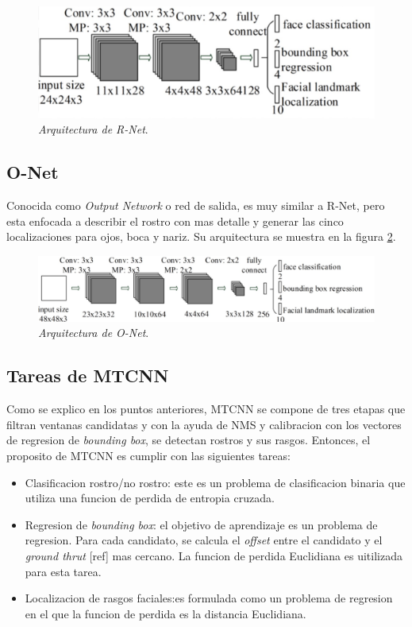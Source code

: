 \begin{figure}[h]
	\centering
	\includegraphics[scale=0.25]{./Figures/mtcnn_rnet.png}
	\caption{\textit{Arquitectura de R-Net}.}
	\label{fig:mtcnn_rnet}
\end{figure}

\subsection{O-Net}
Conocida como \textit{Output Network} o red de salida, es muy similar a R-Net, pero esta enfocada a describir el rostro con mas detalle y generar las cinco localizaciones para ojos, boca y nariz. Su arquitectura se muestra en la figura \ref{fig:mtcnn_onet}.

\begin{figure}[h]
	\centering
	\includegraphics[scale=0.3]{./Figures/mtcnn_onet.png}
	\caption{\textit{Arquitectura de O-Net}.}
	\label{fig:mtcnn_onet}
\end{figure}

\subsection{Tareas de MTCNN}
Como se explico en los puntos anteriores, MTCNN se compone de tres etapas que filtran ventanas candidatas y con la ayuda de NMS y calibracion con los vectores de regresion de \textit{bounding box}, se detectan rostros y sus rasgos. Entonces, el proposito de MTCNN es cumplir con las siguientes tareas:
\begin{itemize}
	\item Clasificacion rostro/no rostro: este es un problema de clasificacion binaria que utiliza una funcion de perdida de entropia cruzada. 
	\item Regresion de \textit{bounding box}: el objetivo de aprendizaje es un problema de regresion. Para cada candidato, se calcula el \textit{offset} entre el candidato y el \textit{ground thrut} [ref] mas cercano. La funcion de perdida Euclidiana es uitilizada para esta tarea.
	\item Localizacion de rasgos faciales:es formulada como un problema de regresion en el que la funcion de perdida es la distancia Euclidiana.
\end{itemize}

